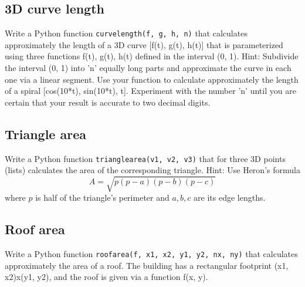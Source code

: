 
\subsection{3D curve length}

Write a Python function {\tt curvelength(f, g, h, n)} that calculates approximately 
the length of a 3D curve [f(t), g(t), h(t)] that is parameterized using three functions 
f(t), g(t), h(t) defined in the interval (0, 1). Hint: Subdivide the 
interval (0, 1) into 'n' equally long parts and approximate the curve in each one via 
a linear segment. Use your function to calculate approximately the length 
of a spiral [cos(10*t), sin(10*t), t]. Experiment with the number 'n' until you 
are certain that your result is accurate to two decimal digits.


\subsection{Triangle area}

Write a Python function {\tt trianglearea(v1, v2, v3)} that for three 3D points (lists) 
calculates the area of the corresponding triangle. Hint: Use Heron's formula 
$$
A = \sqrt{p(p-a)(p-b)(p-c)}
$$
where $p$ is half of the triangle's perimeter and $a, b, c$ are its edge lengths. 


\subsection{Roof area}

Write a Python function {\tt roofarea(f, x1, x2, y1, y2, nx, ny)} that calculates approximately the area of a roof. 
The building has a rectangular footprint (x1, x2)x(y1, y2), and the roof is given via a function f(x, y). 

